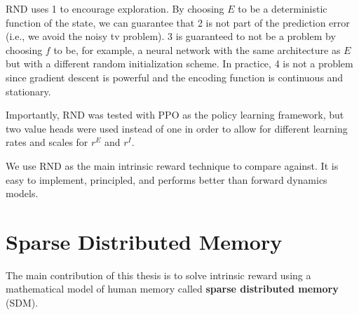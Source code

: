\documentclass[journal, onecolumn, 12pt, draftclsnofoot]{IEEEtran}
\newcommand{\kword}[1]{\textbf{#1}}
\begin{document}
	RND uses 1 to encourage exploration. By choosing $E$ to be a deterministic function of the state, we can guarantee that 2 is not part of the prediction error (i.e., we avoid the noisy tv problem). 3 is guaranteed to not be a problem by choosing $f$ to be, for example, a neural network with the same architecture as $E$ but with a different random initialization scheme. In practice, 4 is not a problem since gradient descent is powerful and the encoding function is continuous and stationary.
	\par Importantly, RND was tested with PPO as the policy learning framework, but two value heads were used instead of one in order to allow for different learning rates and scales for $r^E$ and $r^I$.
	\par We use RND as the main intrinsic reward technique to compare against. It is easy to implement, principled, and performs better than forward dynamics models.

	\newpage
	\section{Sparse Distributed Memory}
	\label{sec:sdm}
	\par The main contribution of this thesis is to solve intrinsic reward using a mathematical model of human memory called \kword{sparse distributed memory} (SDM).
\end{document}
